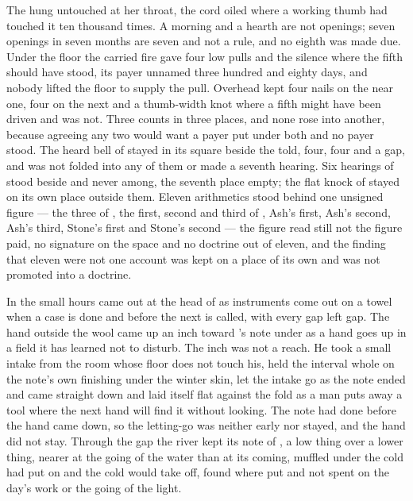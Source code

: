 The  hung untouched at her throat, the cord oiled where a working thumb had touched it ten thousand times. A morning and a hearth are not openings; seven openings in seven months are seven and not a rule, and no eighth was made due. Under the floor the carried fire gave four low pulls and the silence where the fifth should have stood, its payer unnamed three hundred and eighty days, and nobody lifted the floor to supply the pull. Overhead  kept four nails on the near one, four on the next and a thumb-width knot where a fifth might have been driven and was not. Three counts in three places, and none rose into another, because agreeing any two would want a payer put under both and no payer stood. The heard bell of  stayed in its square beside the told, four, four and a gap, and was not folded into any of them or made a seventh hearing. Six hearings of  stood beside and never among, the seventh place empty; the flat knock of  stayed on its own place outside them. Eleven arithmetics stood behind one unsigned figure --- the three of , the first, second and third of , Ash's first, Ash's second, Ash's third, Stone's first and Stone's second --- the figure read still not the figure paid, no signature on the space and no doctrine out of eleven, and the finding that eleven were not one account was kept on a place of its own and was not promoted into a doctrine.

\scenebreak

In the small hours  came out at the head of  as instruments come out on a towel when a case is done and before the next is called, with every gap left gap. The hand outside the wool came up an inch toward 's note under  as a hand goes up in a field it has learned not to disturb. The inch was not a reach. He took a small intake from the room whose floor does not touch his, held the interval whole on the note's own finishing under the winter skin, let the intake go as the note ended and came straight down and laid itself flat against the fold as a man puts away a tool where the next hand will find it without looking. The note had done before the hand came down, so the letting-go was neither early nor stayed, and the hand did not stay. Through the gap the river kept its note of , a low thing over a lower thing, nearer at the going of the water than at its coming, muffled under  the cold had put on and the cold would take off, found where put and not spent on the day's work or the going of the light.

